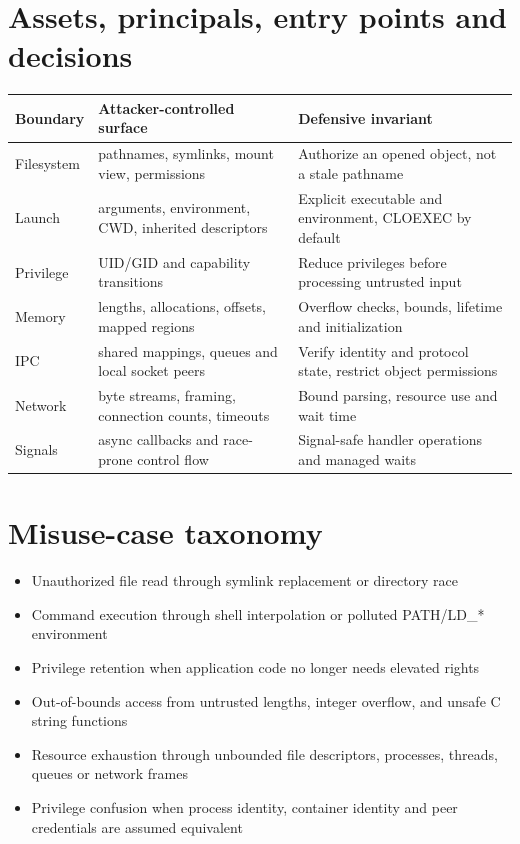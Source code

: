 \documentclass[11pt,letterpaper,oneside]{report}
\begin{document}
\section{Assets, principals, entry points and decisions}
\begin{longtable}{>{\raggedright\arraybackslash}p{.20\linewidth}>{\raggedright\arraybackslash}p{.32\linewidth}>{\raggedright\arraybackslash}p{.37\linewidth}}\toprule
Boundary & Attacker-controlled surface & Defensive invariant\\\midrule\endhead
Filesystem & pathnames, symlinks, mount view, permissions & Authorize an opened object, not a stale pathname\\
Launch & arguments, environment, CWD, inherited descriptors & Explicit executable and environment, CLOEXEC by default\\
Privilege & UID/GID and capability transitions & Reduce privileges before processing untrusted input\\
Memory & lengths, allocations, offsets, mapped regions & Overflow checks, bounds, lifetime and initialization\\
IPC & shared mappings, queues and local socket peers & Verify identity and protocol state, restrict object permissions\\
Network & byte streams, framing, connection counts, timeouts & Bound parsing, resource use and wait time\\
Signals & async callbacks and race-prone control flow & Signal-safe handler operations and managed waits\\
\bottomrule\end{longtable}\section{Misuse-case taxonomy}
\begin{itemize}
\item Unauthorized file read through symlink replacement or directory race
\item Command execution through shell interpolation or polluted PATH/LD\_* environment
\item Privilege retention when application code no longer needs elevated rights
\item Out-of-bounds access from untrusted lengths, integer overflow, and unsafe C string functions
\item Resource exhaustion through unbounded file descriptors, processes, threads, queues or network frames
\item Privilege confusion when process identity, container identity and peer credentials are assumed equivalent
\end{itemize}
\end{document}
